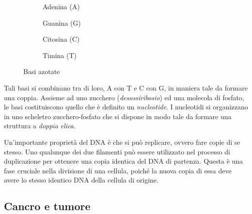 \begin{figure}[!h]
    \begin{subfigure}[b]{0.5 \textwidth}
        \centering
        \adenina
        \caption{Adenina (A)}
        \vspace{4ex}
        \label{fig:intro-biology-dna-adenina}
    \end{subfigure}
    \begin{subfigure}[b]{0.5 \textwidth}
        \centering
        \guanina
        \caption{Guanina (G)}
        \vspace{4ex}
        \label{fig:intro-biology-dna-guanina}
    \end{subfigure}
    \begin{subfigure}[b]{0.5 \textwidth}
        \centering
        \citosina
        \caption{Citosina (C)}
        \label{fig:intro-biology-dna-citosina}
    \end{subfigure}
    \begin{subfigure}[b]{0.5 \textwidth}
        \centering
        \timina
        \caption{Timina (T)}
        \label{fig:intro-biology-dna-timina}
    \end{subfigure}
    \label{fig:intro-biology-dna-basi}
    \caption{Basi azotate}
\end{figure}

Tali basi si combinano tra di loro, A con T e C con G, in maniera tale da formare una coppia. Assieme ad uno zucchero (\textit{desossiribosio}) ed una molecola di fosfato, le basi costituiscono quello che è definito un \textit{nucleotide}. I nucleotidi si organizzano in uno scheletro zucchero-fosfato che si dispone in modo tale da formare una struttura a \textit{doppia elica}.

Un'importante proprietà del DNA è che si può replicare, ovvero fare copie di se stesso. Uno qualunque dei due filamenti può essere utilizzato nel processo di duplicazione per ottenere una copia identica del DNA di partenza. Questa è una fase cruciale nella divisione di una cellula, poiché la nuova copia di essa deve avere lo stesso identico DNA della cellula di origine.

\subsection{Cancro e tumore}
\label{chap:intro-biology-cancer}

